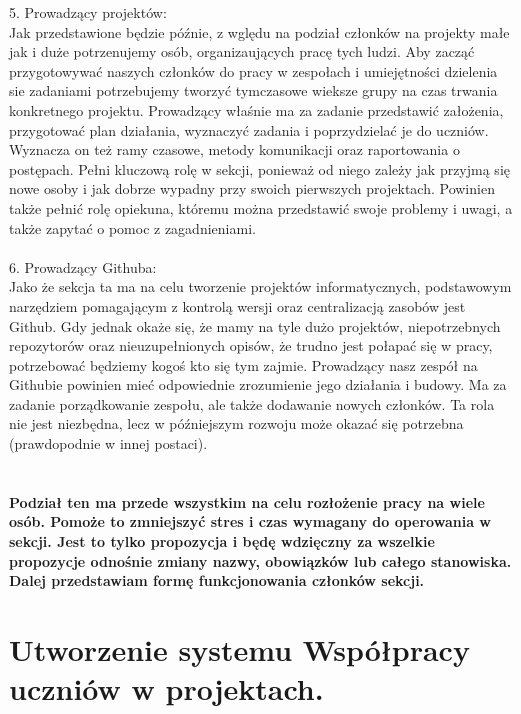 \documentclass[9pt,a4paper]{report}
\begin{document}
5. Prowadzący projektów:\\
Jak przedstawione będzie późnie, z wględu na podział członków na projekty małe jak i duże potrzenujemy osób, organizaujących pracę tych ludzi. Aby zacząć przygotowywać naszych członków do pracy w zespołach i umiejętności dzielenia sie zadaniami potrzebujemy tworzyć tymczasowe wieksze grupy na czas trwania konkretnego projektu. Prowadzący właśnie ma za zadanie przedstawić założenia, przygotować plan działania, wyznaczyć zadania i poprzydzielać je do uczniów. Wyznacza on też ramy czasowe, metody komunikacji oraz raportowania o postępach.
Pełni kluczową rolę w sekcji, ponieważ od niego zależy jak przyjmą się nowe osoby i jak dobrze wypadny przy swoich pierwszych projektach. Powinien także pełnić rolę opiekuna, któremu można przedstawić swoje problemy i uwagi, a także zapytać o pomoc z zagadnieniami.\\\\

6. Prowadzący Githuba:\\
Jako że sekcja ta ma na celu tworzenie projektów informatycznych, podstawowym narzędziem pomagającym z kontrolą wersji oraz centralizacją zasobów jest Github. Gdy jednak okaże się, że mamy na tyle dużo projektów, niepotrzebnych repozytorów oraz nieuzupełnionych opisów, że trudno jest połapać się w pracy, potrzebować będziemy kogoś kto się tym zajmie. Prowadzący nasz zespół na Githubie powinien mieć odpowiednie zrozumienie jego działania i budowy. Ma za zadanie porządkowanie zespołu, ale także dodawanie nowych członków. Ta rola nie jest niezbędna, lecz w późniejszym rozwoju może okazać się potrzebna (prawdopodnie w innej postaci).\\\\\\
 
\textbf{Podział ten ma przede wszystkim na celu rozłożenie pracy na wiele osób. Pomoże to zmniejszyć stres i czas wymagany do operowania w sekcji. Jest to tylko propozycja i będę wdzięczny za wszelkie propozycje odnośnie zmiany nazwy, obowiązków lub całego stanowiska. Dalej przedstawiam formę funkcjonowania członków sekcji.}

\section{Utworzenie systemu Współpracy uczniów w projektach.}
\end{document}
